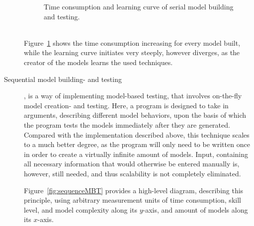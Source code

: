 \begin{description}
\begin{figure}[h]
    \caption{Time consumption and learning curve of serial model building and testing.}
    \label{fig:serialMBT}
  \end{figure}\ \\
  Figure~\ref{fig:serialMBT} shows the time consumption increasing for every model built, while the learning curve initiates very steeply, however diverges, as the creator of the models learns the used techniques. 
  \item[Sequential model building- and testing],
  is a way of implementing model-based testing, that involves on-the-fly model creation- and testing. Here, a program is designed to take in arguments, describing different model behaviors, upon the basis of which the program tests the models immediately after they are generated. Compared with the implementation described above, this technique scales to a much better degree, as the program will only need to be written once in order to create a virtually infinite amount of models. 
  Input, containing all necessary information that would otherwise be entered manually is, however, still needed, and thus scalability is not completely eliminated. 

  Figure~\ref{fig:sequenceMBT} provides a high-level diagram, describing this principle, using arbitrary measurement units of time consumption, skill level, and model complexity along its $y$-axis, and amount of models along its $x$-axis.
  \begin{figure}[h]
    \centering
\end{figure}
\end{description}
